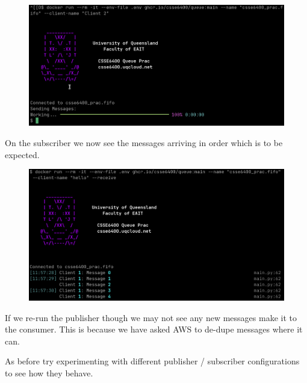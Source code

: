 \documentclass{csse4400}
\begin{document}
\begin{figure}[H]
  \includegraphics[width=\textwidth]{images/fifopub}
\end{figure}

On the subscriber we now see the messages arriving in order which is to be expected.

\begin{figure}[H]
  \includegraphics[width=\textwidth]{images/fifosub}
\end{figure}

If we re-run the publisher though we may not see any new messages make it to the consumer.
This is because we have asked AWS to de-dupe messages where it can.


As before try experimenting with different publisher / subscriber configurations to see how they behave.


\end{document}
